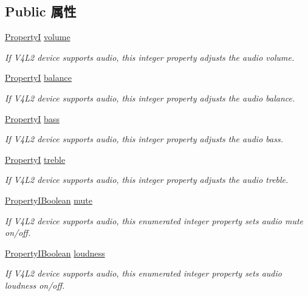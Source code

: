 \subsection*{Public 属性}
\begin{DoxyCompactItemize}
\item 
\hyperlink{group___common_interface_ga12d5e434238ca242a1ba4c6c3ea45780}{Property\+I} \hyperlink{classmv_i_m_p_a_c_t_1_1acquire_1_1_system_v4_l2_a82bfb9912fe48b47fa7aef6ebbd8f6ed}{volume}
\begin{DoxyCompactList}\small\item\em If V4\+L2 device supports audio, this integer property adjusts the audio volume. \end{DoxyCompactList}\item 
\hyperlink{group___common_interface_ga12d5e434238ca242a1ba4c6c3ea45780}{Property\+I} \hyperlink{classmv_i_m_p_a_c_t_1_1acquire_1_1_system_v4_l2_adfb8953ab9f2bcddbdd422e870406647}{balance}
\begin{DoxyCompactList}\small\item\em If V4\+L2 device supports audio, this integer property adjusts the audio balance. \end{DoxyCompactList}\item 
\hyperlink{group___common_interface_ga12d5e434238ca242a1ba4c6c3ea45780}{Property\+I} \hyperlink{classmv_i_m_p_a_c_t_1_1acquire_1_1_system_v4_l2_adc8687d88c348d97408a71df4d4c325d}{bass}
\begin{DoxyCompactList}\small\item\em If V4\+L2 device supports audio, this integer property adjusts the audio bass. \end{DoxyCompactList}\item 
\hyperlink{group___common_interface_ga12d5e434238ca242a1ba4c6c3ea45780}{Property\+I} \hyperlink{classmv_i_m_p_a_c_t_1_1acquire_1_1_system_v4_l2_a09176cb99b8be1e10aaf20ecb02727c2}{treble}
\begin{DoxyCompactList}\small\item\em If V4\+L2 device supports audio, this integer property adjusts the audio treble. \end{DoxyCompactList}\item 
\hyperlink{group___common_interface_ga44f9437e24b21b6c93da9039ec6786aa}{Property\+I\+Boolean} \hyperlink{classmv_i_m_p_a_c_t_1_1acquire_1_1_system_v4_l2_a10c2ec2e367c18d8c1d0e74ea517800d}{mute}
\begin{DoxyCompactList}\small\item\em If V4\+L2 device supports audio, this enumerated integer property sets audio mute on/off. \end{DoxyCompactList}\item 
\hyperlink{group___common_interface_ga44f9437e24b21b6c93da9039ec6786aa}{Property\+I\+Boolean} \hyperlink{classmv_i_m_p_a_c_t_1_1acquire_1_1_system_v4_l2_a0d985a0ecf44621535546bdee8b981ca}{loudness}
\begin{DoxyCompactList}\small\item\em If V4\+L2 device supports audio, this enumerated integer property sets audio loudness on/off. \end{DoxyCompactList}\end{DoxyCompactItemize}
